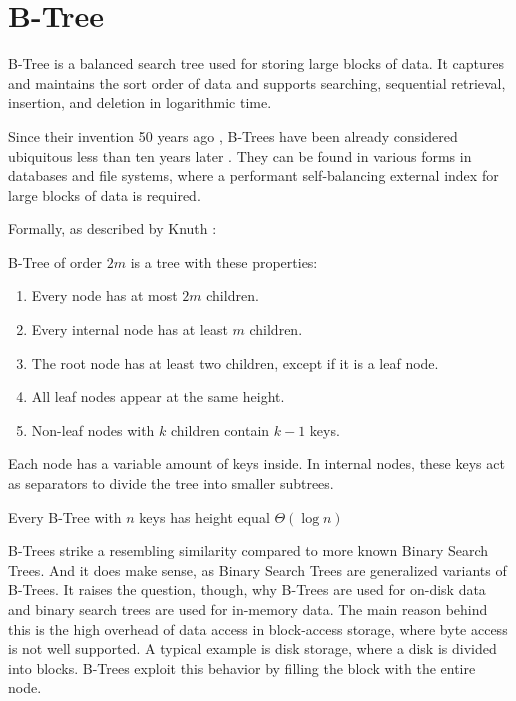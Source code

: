 \section{B-Tree}

B-Tree is a balanced search tree used for storing large blocks of data. It captures and maintains the sort order of data and supports searching, sequential retrieval, insertion, and deletion in logarithmic time.

Since their invention 50 years ago \cite{bayer-org}, B-Trees have been already considered ubiquitous less than ten years later \cite{10.1145/356770.356776}. They can be found in various forms in databases and file systems, where a performant self-balancing external index for large blocks of data is required.

Formally, as described by Knuth \cite{knuth1998art}:

\begin{definition}\label{def:btree}
  B-Tree of order $2m$ is a tree with these properties:
  \begin{enumerate}
    \item Every node has at most $2m$ children.
    \item Every internal node has at least $m$ children.
    \item The root node has at least two children, except if it is a leaf node.
    \item All leaf nodes appear at the same height.
    \item Non-leaf nodes with $k$ children contain $k - 1$ keys.
  \end{enumerate}
\end{definition}

Each node has a variable amount of keys inside. In internal nodes, these keys act as separators to divide the tree into smaller subtrees. 




\begin{lemma}
  Every B-Tree with $n$ keys has height equal $\Theta(\log{n})$
\end{lemma}


B-Trees strike a resembling similarity compared to more known Binary Search Trees. And it does make sense, as Binary Search Trees are generalized variants of B-Trees. It raises the question, though, why B-Trees are used for on-disk data and binary search trees are used for in-memory data. The main reason behind this is the high overhead of data access in block-access storage, where byte access is not well supported. A typical example is disk storage, where a disk is divided into blocks. B-Trees exploit this behavior by filling the block with the entire node.

